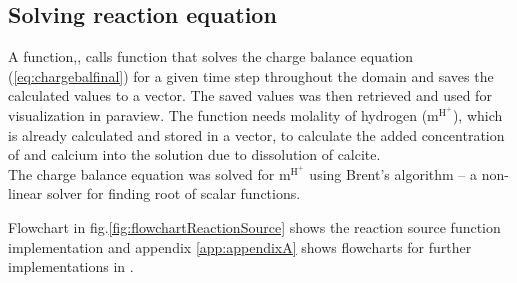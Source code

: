 
\subsection*{Solving reaction equation} A function,, calls  function that solves the charge balance equation (\ref{eq:chargebalfinal}) for a given time step throughout the domain and saves the calculated values to a vector. The saved values was then retrieved and used for visualization in paraview. The function  needs molality of hydrogen ($\mathrm{m^{H^+}}$), which is already calculated and stored in a vector, to calculate the added concentration of  and calcium into the solution due to dissolution of calcite. \\
The charge balance equation was solved for $\mathrm{m^{H^+}}$ using Brent's algorithm \citet{brent1971algorithm} -- a non-linear solver for finding root of scalar functions. 


Flowchart in fig.\ref{fig:flowchartReactionSource} shows the reaction source function implementation and appendix \ref{app:appendixA} shows flowcharts for further implementations in \DuMuX.



